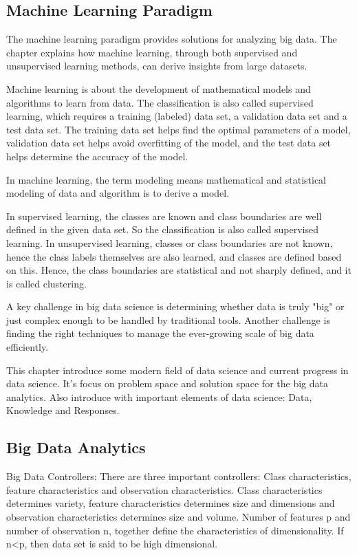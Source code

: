 \documentclass[conference,12pt]{IEEEtran}
\begin{document}
\subsection{Machine Learning Paradigm}
The machine learning paradigm provides solutions for analyzing big data. The chapter explains how machine learning, through both supervised and unsupervised learning methods, can derive insights from large datasets. 

Machine learning is about the development of mathematical models and algorithms to learn from data. The classification is also called supervised learning, which requires a training (labeled) data set, a validation data set and a test data set. The training data set helps find the optimal parameters of a model, validation data set helps avoid overfitting of the model, and the test data set helps determine the accuracy of the model.

In machine learning, the term modeling means mathematical and statistical modeling of data  and algorithm is to derive a model.

In supervised learning, the classes are known and class boundaries are well defined in the given data set. So the classification is also called supervised learning. In unsupervised learning, classes or class boundaries are not known, hence the class labels themselves are also learned, and classes are defined based on this. Hence, the class boundaries are statistical and not sharply defined, and it is called clustering.

A key challenge in big data science is determining whether data is truly "big" or just complex enough to be handled by traditional tools. Another challenge is finding the right techniques to manage the ever-growing scale of big data efficiently.

This chapter introduce some modern field of data science and current progress in data science. It's focus on problem space and solution space for the big data analytics. Also introduce with important elements of data science: Data, Knowledge and Responses.
\newpage
{}
\setcounter{subsection}{0} 
\subsection{Big Data Analytics}
Big Data Controllers: There are three important controllers: Class characteristics, feature characteristics and observation characteristics. Class characteristics determines variety, feature characteristics determines size and dimensions and observation characteristics determines size and volume. Number of features p and number of observation n, together define the characteristics of dimensionality. If n<p, then data set is said to be high dimensional.
\end{document}
